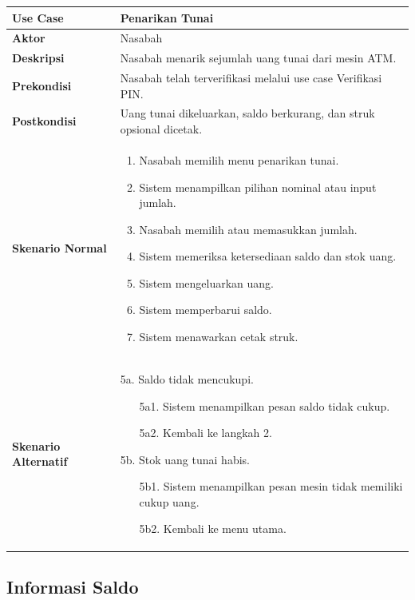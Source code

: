 \documentclass[conference,10pt]{IEEEtran}
\begin{document}
\begin{center}
\begin{tabular}{|L{2.3cm}|L{5cm}|}
\hline
\textbf{Use Case} & Penarikan Tunai \\
\hline
\textbf{Aktor} & Nasabah \\
\hline
\textbf{Deskripsi} & Nasabah menarik sejumlah uang tunai dari mesin ATM. \\
\hline
\textbf{Prekondisi} & Nasabah telah terverifikasi melalui use case Verifikasi PIN. \\
\hline
\textbf{Postkondisi} & Uang tunai dikeluarkan, saldo berkurang, dan struk opsional dicetak. \\
\hline
\textbf{Skenario Normal} &
\begin{enumerate}
\setlength\itemsep{0pt}
\item Nasabah memilih menu penarikan tunai.
\item Sistem menampilkan pilihan nominal atau input jumlah.
\item Nasabah memilih atau memasukkan jumlah.
\item Sistem memeriksa ketersediaan saldo dan stok uang.
\item Sistem mengeluarkan uang.
\item Sistem memperbarui saldo.
\item Sistem menawarkan cetak struk.
\end{enumerate} \\
\hline
\textbf{Skenario Alternatif} &
5a. Saldo tidak mencukupi.
\begin{enumerate}
\setlength\itemsep{0pt}
\item[5a1.] Sistem menampilkan pesan saldo tidak cukup.
\item[5a2.] Kembali ke langkah 2.
\end{enumerate}
5b. Stok uang tunai habis.
\begin{enumerate}
\setlength\itemsep{0pt}
\item[5b1.] Sistem menampilkan pesan mesin tidak memiliki cukup uang.
\item[5b2.] Kembali ke menu utama.
\end{enumerate} \\
\hline
\end{tabular}
\end{center}

\subsection{Informasi Saldo}
\end{document}

